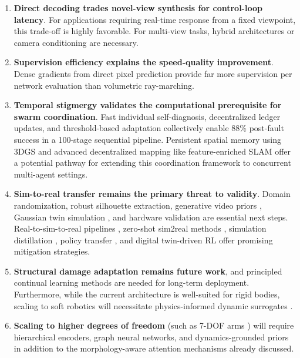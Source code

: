 \documentclass[12pt,a4paper,oneside]{report}
\begin{document}
\begin{enumerate}
    \item \textbf{Direct decoding trades novel-view synthesis for control-loop latency}. For applications requiring real-time response from a fixed viewpoint, this trade-off is highly favorable. For multi-view tasks, hybrid architectures or camera conditioning are necessary.
    
    \item \textbf{Supervision efficiency explains the speed-quality improvement}. Dense gradients from direct pixel prediction provide far more supervision per network evaluation than volumetric ray-marching.
    
    \item \textbf{Temporal stigmergy validates the computational prerequisite for swarm coordination}. Fast individual self-diagnosis, decentralized ledger updates, and threshold-based adaptation collectively enable 88\% post-fault success in a 100-stage sequential pipeline. Persistent spatial memory using 3DGS \cite{lu2025gsmem} and advanced decentralized mapping like feature-enriched SLAM \cite{thirgood2025featureslam} offer a potential pathway for extending this coordination framework to concurrent multi-agent settings.
    
    \item \textbf{Sim-to-real transfer remains the primary threat to validity}. Domain randomization, robust silhouette extraction, generative video priors \cite{he2025vdreamer}, Gaussian twin simulation \cite{cai2025gausstwin}, and hardware validation are essential next steps. Real-to-sim-to-real pipelines \cite{torne2024rialto}, zero-shot sim2real methods \cite{qureshi2025splatsim, tang2025semantic}, simulation distillation \cite{levy2024simdist}, policy transfer \cite{jiang2024transic}, and digital twin-driven RL \cite{xu2025twinrl} offer promising mitigation strategies.
    
    \item \textbf{Structural damage adaptation remains future work}, and principled continual learning methods are needed for long-term deployment. Furthermore, while the current architecture is well-suited for rigid bodies, scaling to soft robotics will necessitate physics-informed dynamic surrogates \cite{jiang2024phystwin}.
    
    \item \textbf{Scaling to higher degrees of freedom} (such as 7-DOF arms \cite{schulze2024high}) will require hierarchical encoders, graph neural networks, and dynamics-grounded priors \cite{rajeswaran2025embodiedynamics} in addition to the morphology-aware attention mechanisms \cite{patel2024getzero} already discussed.
\end{enumerate}
\end{document}

